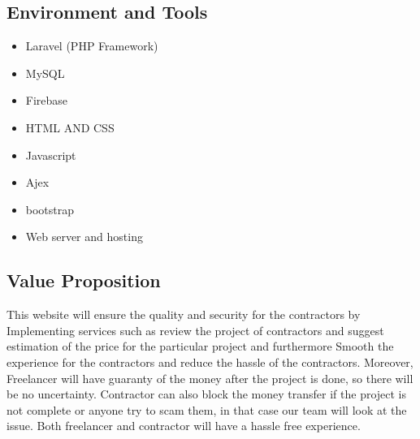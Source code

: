 \documentclass{article}
\begin{document}
    \subsection{Environment and Tools}
        \begin{itemize}
            \item  
            Laravel (PHP Framework)
            \item 
            MySQL
            \item
            Firebase
            \item
            HTML AND CSS
            \item
            Javascript
            \item
            Ajex
            \item
            bootstrap
            \item
            Web server and hosting
            
        \end{itemize}
    \subsection{Value Proposition}
    This website will ensure the quality and security for the contractors by Implementing services such as review the project of contractors and suggest estimation of the price for the particular project and furthermore Smooth the experience for the contractors and reduce the hassle of the contractors. Moreover, Freelancer will have guaranty of the money after the project is done, so there will be no uncertainty. Contractor can also block the money transfer if the project is not complete or anyone try to scam them, in that case our team will look at the issue. Both freelancer and contractor will have a hassle free experience. 

    \pagebreak
\end{document}
